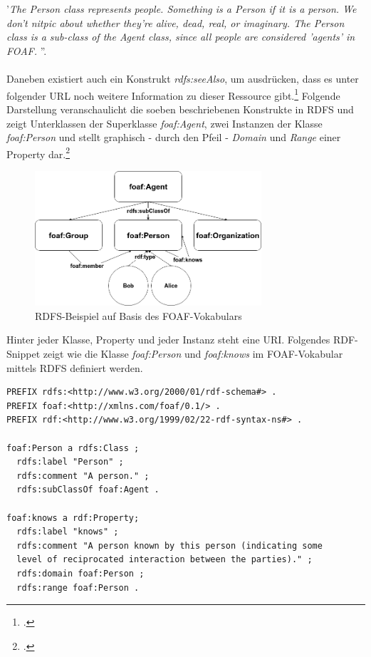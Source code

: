 \documentclass[12pt,a4paper]{article}
\begin{document}
\\
\\
'\textit{The Person class represents people. Something is a Person if it is a person. We don't nitpic about whether they're alive, dead, real, or imaginary. The Person class is a sub-class of the Agent class, since all people are considered 'agents' in FOAF. }''.
\\
\\
Daneben existiert auch ein Konstrukt \textit{rdfs:seeAlso}, um ausdrücken, dass es unter folgender URL noch weitere Information zu dieser Ressource gibt.\footcite{brickley2014rdf} Folgende Darstellung veranschaulicht die soeben beschriebenen Konstrukte in RDFS und zeigt Unterklassen der Superklasse \textit{foaf:Agent}, zwei Instanzen der Klasse \textit{foaf:Person} und stellt graphisch - durch den Pfeil - \textit{Domain} und \textit{Range} einer Property dar.\footcite[][S.33-88]{hitzler2007semantic}  
\begin{figure}[H]
  \centering
	\includegraphics[width=0.75\textwidth]{img/rdfs.png}  
    \caption[RDFS-Beispiel auf Basis des FOAF-Vokabulars, eigene Darstellung.]{RDFS-Beispiel auf Basis des FOAF-Vokabulars}
  	\label{fig:rdf}
\end{figure}
Hinter jeder Klasse, Property und jeder Instanz steht eine URI. Folgendes RDF-Snippet zeigt wie die Klasse \textit{foaf:Person} und \textit{foaf:knows} im FOAF-Vokabular mittels RDFS definiert werden.


\begin{lstlisting}[]
PREFIX rdfs:<http://www.w3.org/2000/01/rdf-schema#> .
PREFIX foaf:<http://xmlns.com/foaf/0.1/> .
PREFIX rdf:<http://www.w3.org/1999/02/22-rdf-syntax-ns#> .

foaf:Person a rdfs:Class ;
  rdfs:label "Person" ;
  rdfs:comment "A person." ;
  rdfs:subClassOf foaf:Agent .
  
foaf:knows a rdf:Property;
  rdfs:label "knows" ;
  rdfs:comment "A person known by this person (indicating some 
  level of reciprocated interaction between the parties)." ;
  rdfs:domain foaf:Person ;
  rdfs:range foaf:Person .
\end{lstlisting}
\end{document}

